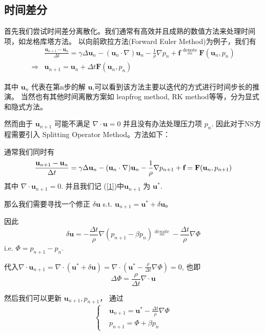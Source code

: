 \subsection{时间差分}
首先我们尝试时间差分离散化。我们通常有高效并且成熟的数值方法来处理时间项，如龙格库塔方法。
以向前欧拉方法(Forward Euler Method)为例子，我们有
\begin{equation}
    \begin{aligned}
    &\frac{\textbf{u}_{n+1}-\textbf{u}_n}{\Delta t}=\gamma \Delta \textbf{u}_n-(\textbf{u}_n\cdot \nabla) \textbf{u}_n-\frac{1}{\rho}\nabla p_n+\textbf{f}\stackrel{\text{denote}}{=}\textbf{F}(\textbf{u}_n,p_n)\\
    \Rightarrow&\textbf{u}_{n+1}=\textbf{u}_n+\Delta t \textbf{F}(\textbf{u}_n,p_n)
    \end{aligned}  
    \label{1}
\end{equation}

其中 $\textbf{u}_n$ 代表在第n步的解 $\textbf{u}$,可以看到该方法主要以迭代的方式进行时间步长的推演。
当然也有其他时间离散方案如 leapfrog method, RK method等等，分为显式和隐式方法。 

然而由于 $\textbf{u}_{n+1}$ 可能不满足 $\nabla \cdot \textbf{u}=0$ 并且没有办法处理压力项 $p_n$. 
因此对于NS方程需要引入 Splitting Operator Method。方法如下：

通常我们同时有 
\begin{equation}
    \frac{\textbf{u}_{n+1}-\textbf{u}_n}{\Delta t}=\gamma \Delta \textbf{u}_n-(\textbf{u}_n\cdot \nabla) \textbf{u}_n-\frac{1}{\rho}\nabla p_{n+1}+\textbf{f}=\textbf{F}(\textbf{u}_n,p_{n+1})\\
\end{equation}
其中 $\nabla \cdot \textbf{u}_{n+1}=0$. 并且我们记 (\ref*{1})中$\textbf{u}_{n+1}$  为 $\textbf{u}^*$. 

那么我们需要寻找一个修正 $\delta \textbf{u}$ s.t. $\textbf{u}_{n+1}=\textbf{u}^*+\delta \textbf{u}$。

因此
 $$\delta \textbf{u}=-\frac{\Delta t}{\rho}\nabla(p_{n+1}-\beta p_n)\stackrel{denote}{=}-\frac{\Delta t}{\rho}\nabla \Phi$$
i.e. $\Phi=p_{n+1}-p_n$. 

代入$\nabla\cdot \textbf{u}_{n+1}=\nabla \cdot(\textbf{u}^*+\delta \textbf{u})=\nabla \cdot (\textbf{u}^*-\frac{\rho}{\Delta t}\nabla\Phi)=0$, 
也即
\begin{equation}
    \Delta \Phi = \frac{\rho}{\Delta t}\nabla \cdot \textbf{u}
    \label{Possion}
\end{equation} 

然后我们可以更新 $\textbf{u}_{n+1},p_{n+1}$， 通过 
\begin{equation}\label{2-4}\left\{
    \begin{aligned}
        &\textbf{u}_{n+1}=\textbf{u}^*-\frac{\Delta t}{\rho}\nabla \Phi\\
        &p_{n+1}=\Phi + \beta p_n
    \end{aligned}\right.
\end{equation}

